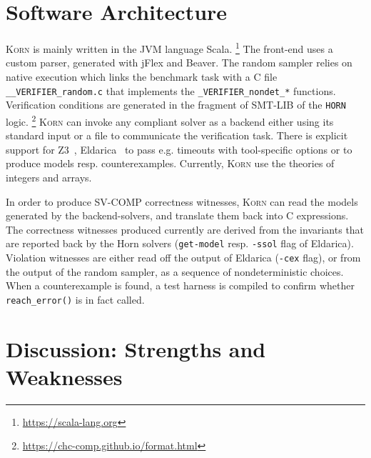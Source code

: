 \documentclass{llncs}
\newcommand{\Korn}{\textsc{Korn}\xspace}
\begin{document}
\section{Software Architecture}
\label{sec:architecture}

\Korn is mainly written in the JVM language Scala.%
    \footnote{\url{https://scala-lang.org}}
The front-end uses a custom parser, generated with jFlex and Beaver.
The random sampler relies on native execution which links
the benchmark task with a C file \verb!__VERIFIER_random.c!
that implements the \verb!_VERIFIER_nondet_*! functions.
Verification conditions are generated in the fragment of SMT-LIB of the \texttt{HORN} logic.%
    \footnote{\url{https://chc-comp.github.io/format.html}}
\Korn can invoke any compliant solver as a backend either using its standard input or a file to communicate the verification task.
There is explicit support for Z3~\cite{gurfinkel2019science}, Eldarica~\cite{hojjat2018eldarica} %
to pass e.g. timeouts with tool-specific options or to produce models resp. counterexamples.
Currently, \Korn use the theories of integers and arrays.

In order to produce SV-COMP correctness witnesses, \Korn can read the models generated by the backend-solvers, and translate them back into C expressions.
The correctness witnesses produced currently are derived from
the invariants that are reported back by the Horn solvers (\texttt{get-model} resp. \texttt{-ssol} flag of Eldarica).
Violation witnesses are either read off the output of Eldarica (\texttt{-cex} flag),
or from the output of the random sampler, as a sequence of nondeterministic choices.
When a counterexample is found, a test harness is compiled to confirm whether \texttt{reach\_error()} is in fact called.

\section{Discussion: Strengths and Weaknesses}
\label{sec:discussion}
\end{document}
